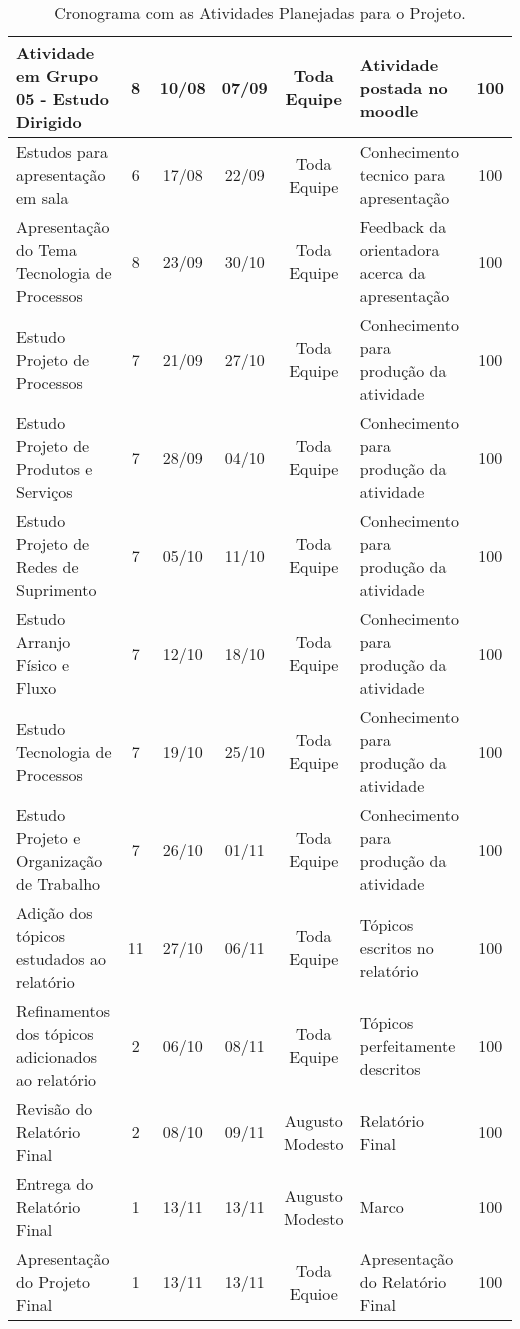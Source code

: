 \begin{landscape}
		\begin{table}[h]
			\centering
			\begin{tabular}{|p{7cm}|c|c|c|c|p{4cm}|c|}
				\hline
				Atividade em Grupo 05 - Estudo Dirigido & 8 & 10/08 & 07/09 & Toda Equipe & Atividade postada no moodle & 100 \\ \hline
				Estudos para apresentação em sala & 6 & 17/08 & 22/09 & Toda Equipe & Conhecimento tecnico para apresentação & 100 \\ \hline
				Apresentação do Tema Tecnologia de Processos\footnotemark[1]& 8 & 23/09 & 30/10 & Toda Equipe & Feedback da orientadora acerca da apresentação & 100 \\ \hline
				Estudo Projeto de Processos & 7 & 21/09 & 27/10 & Toda Equipe & Conhecimento para produção da atividade & 100 \\ \hline
				Estudo Projeto de Produtos e Serviços & 7 & 28/09 & 04/10 & Toda Equipe & Conhecimento para produção da atividade & 100 \\ \hline
				Estudo Projeto de Redes de Suprimento & 7 & 05/10 & 11/10 & Toda Equipe & Conhecimento para produção da atividade & 100 \\ \hline
				Estudo Arranjo Físico e Fluxo & 7 & 12/10 & 18/10 & Toda Equipe & Conhecimento para produção da atividade & 100 \\ \hline
				Estudo Tecnologia de Processos & 7 & 19/10 & 25/10 & Toda Equipe & Conhecimento para produção da atividade & 100 \\ \hline
				Estudo Projeto e Organização de Trabalho & 7 & 26/10 & 01/11 & Toda Equipe & Conhecimento para produção da atividade & 100 \\ \hline
				Adição dos tópicos estudados ao relatório & 11 & 27/10 & 06/11 & Toda Equipe & Tópicos escritos no relatório & 100 \\ \hline
				Refinamentos dos tópicos adicionados ao relatório & 2 & 06/10 & 08/11 & Toda Equipe & Tópicos perfeitamente descritos & 100 \\ \hline
				Revisão do Relatório Final & 2 & 08/10 & 09/11 & Augusto Modesto & Relatório Final & 100 \\ \hline
				Entrega do Relatório Final & 1 & 13/11 & 13/11 & Augusto Modesto & Marco & 100 \\ \hline
				Apresentação do Projeto Final & 1 & 13/11 & 13/11 & Toda Equioe & Apresentação do Relatório Final & 100 \\ \hline
			\end{tabular}
			\caption[Cronograma com as Atividades Planejadas para o Projeto]{Cronograma com as Atividades Planejadas para o Projeto.}
			\label{tab:cronograma_.table}
		\end{table}

\end{landscape}
